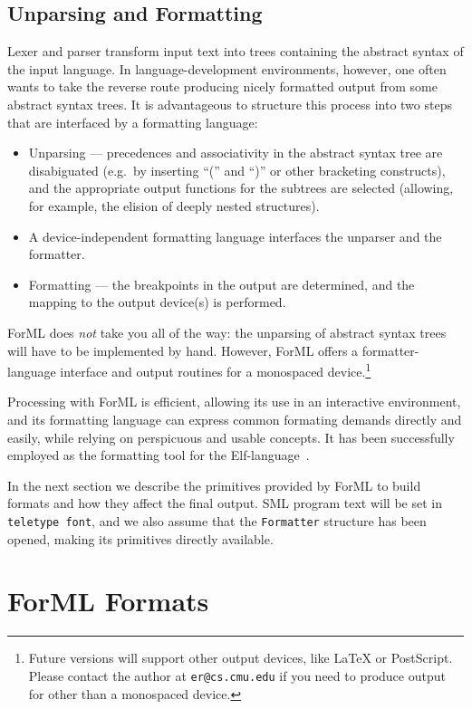 \subsection*{Unparsing and Formatting}
Lexer and parser transform input text into trees
containing the abstract syntax of the input language.
In language-development environments, however, one often wants to
take the reverse route producing nicely formatted output from some
abstract syntax trees.
It is advantageous to structure this process into two steps that are
interfaced by a formatting language:
\begin{itemize}
  \item Unparsing --- precedences and associativity
    in the abstract syntax tree are disabiguated (e.g.\ by
    inserting ``('' and ``)'' or other bracketing constructs),
    and the appropriate output functions for the subtrees are selected
    (allowing, for example, the elision of deeply nested structures).
  \item A device-independent formatting language interfaces
    the unparser and the formatter.
  \item Formatting --- the breakpoints in the output are determined, and
    the mapping to the output device(s) is performed.
\end{itemize}

ForML does {\em not\/} take you all of the way: the unparsing of abstract
syntax trees will have to be implemented by hand. However, ForML offers
a formatter-language interface and output routines for a
monospaced device.\footnote{Future versions will support other output
devices, like LaTeX or PostScript. Please contact the author at
{\tt er@cs.cmu.edu} if you need to produce output for other than a
monospaced device.}

Processing with ForML is efficient, allowing its use in an interactive
environment, and its formatting language can express common formating demands
directly and easily, while relying on perspicuous and usable concepts.
It has been successfully employed as the formatting tool for the
Elf-language~\cite{Pfenning91D}.

In the next section we describe the primitives provided by ForML to
build formats and how they affect the final output.
SML program text will be set in {\tt teletype font}, and we also assume that
the {\tt Formatter} structure has been opened, making its primitives directly
available.

\section{ForML Formats}


